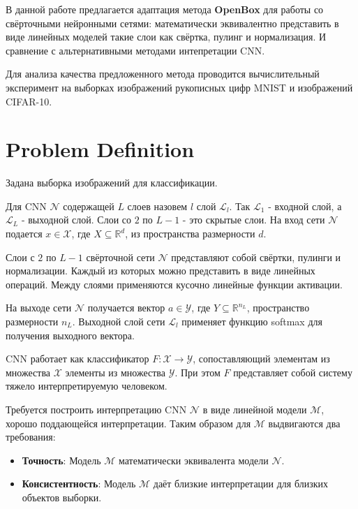 \documentclass[12pt]{article}
\begin{document}
В данной работе предлагается адаптация метода \textbf{OpenBox} для работы со свёрточными нейронными сетями: математически эквивалентно представить в виде линейных моделей такие слои как свёртка, пулинг и нормализация. И сравнение с альтернативными методами интепретации CNN.

Для анализа качества предложенного метода проводится вычислительный эксперимент на выборках изображений рукописных цифр MNIST и изображений CIFAR-10.



\section{Problem Definition}
\label{sec:headings}

Задана выборка изображений для классификации.

Для CNN $\mathcal{N}$ содержащей $L$ слоев назовем $l$ слой $\mathcal{L}_l$. Так $\mathcal{L}_1$ - входной слой, а $\mathcal{L}_L$ - выходной слой. Слои со $2$ по $L-1$ - это скрытые слои. На вход сети $\mathcal{N}$ подается $x \in \mathcal{X}$, где $X \subseteq \mathbb{R}^d$, из пространства размерности $d$. 

Слои с $2$ по $L-1$ свёрточной сети $\mathcal{N}$ представляют собой свёртки, пулинги и нормализации. Каждый из которых можно представить в виде линейных операций. Между слоями применяются кусочно линейные функции активации.

На выходе сети $\mathcal{N}$ получается вектор $a \in \mathcal{Y}$, где $Y \subseteq \mathbb{R}^{n_L}$,  пространство размерности $n_L$. Выходной слой сети $\mathcal{L}_l$ применяет функцию softmax для получения выходного вектора. 

CNN работает как классификатор $F: \mathcal{X} \rightarrow \mathcal{Y}$, сопоставляющий элементам из множества $\mathcal{X}$ элементы из множества $\mathcal{Y}$. При этом $F$ представляет собой систему тяжело интерпретируемую человеком.

Требуется построить интерпретацию CNN $\mathcal{N}$ в виде линейной модели $\mathcal{M}$, хорошо поддающейся интерпретации. Таким образом для $\mathcal{M}$ выдвигаются два требования:
\begin{itemize}
    \item \textbf{Точность}:
    Модель $\mathcal{M}$ математически эквивалента модели $\mathcal{N}$.
    \item \textbf{Консистентность}:
    Модель $\mathcal{M}$ даёт близкие интерпретации для близких объектов выборки.
\end{itemize}
\end{document}
